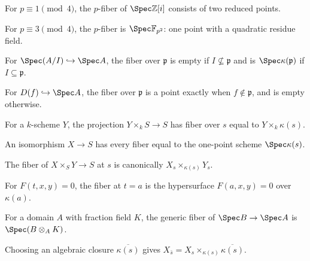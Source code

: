 \begin{example}\label{ex:vi25-r11}
For $p\equiv1\pmod4$, the $p$-fiber of $\Spec\mathbb Z[i]$ consists of two reduced points.
\end{example}
\begin{example}\label{ex:vi25-r12}
For $p\equiv3\pmod4$, the $p$-fiber is $\Spec\mathbb F_{p^2}$: one point with a quadratic residue field.
\end{example}
\begin{example}\label{ex:vi25-r13}
For $\Spec(A/I)\hookrightarrow\Spec A$, the fiber over $\mathfrak p$ is empty if $I\not\subseteq\mathfrak p$ and is $\Spec\kappa(\mathfrak p)$ if $I\subseteq\mathfrak p$.
\end{example}
\begin{example}\label{ex:vi25-r14}
For $D(f)\hookrightarrow\Spec A$, the fiber over $\mathfrak p$ is a point exactly when $f\notin\mathfrak p$, and is empty otherwise.
\end{example}
\begin{example}\label{ex:vi25-r15}
For a $k$-scheme $Y$, the projection $Y\times_kS\to S$ has fiber over $s$ equal to $Y\times_k\kappa(s)$.
\end{example}
\begin{example}\label{ex:vi25-r16}
An isomorphism $X\to S$ has every fiber equal to the one-point scheme $\Spec\kappa(s)$.
\end{example}
\begin{example}\label{ex:vi25-r17}
The fiber of $X\times_SY\to S$ at $s$ is canonically $X_s\times_{\kappa(s)}Y_s$.
\end{example}
\begin{example}\label{ex:vi25-r18}
For $F(t,x,y)=0$, the fiber at $t=a$ is the hypersurface $F(a,x,y)=0$ over $\kappa(a)$.
\end{example}
\begin{example}\label{ex:vi25-r19}
For a domain $A$ with fraction field $K$, the generic fiber of $\Spec B\to\Spec A$ is $\Spec(B\otimes_AK)$.
\end{example}
\begin{example}\label{ex:vi25-r20}
Choosing an algebraic closure $\overline{\kappa(s)}$ gives $X_{\bar s}=X_s\times_{\kappa(s)}\overline{\kappa(s)}$.
\end{example}
